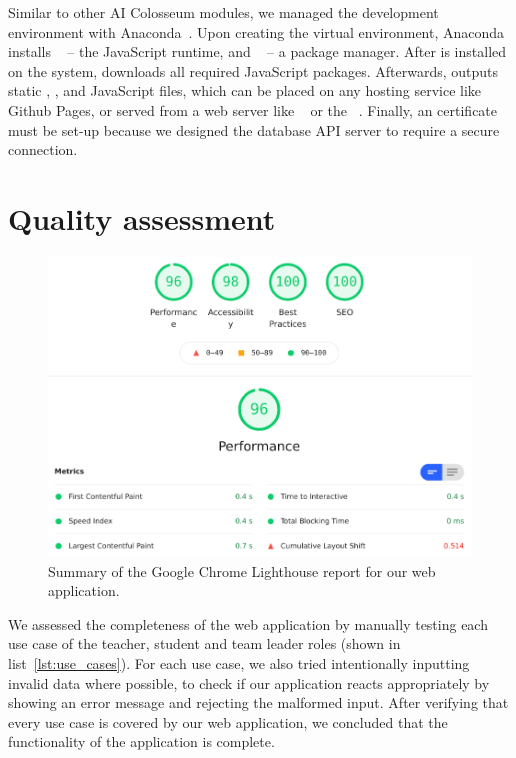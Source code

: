 Similar to other AI Colosseum modules, we managed the development environment with Anaconda~\cite{anaconda}. Upon creating the virtual environment, Anaconda installs ~\cite{nodejs} -- the JavaScript runtime, and ~\cite{yarn} -- a  package manager. After  is installed on the system,  downloads all required JavaScript packages. Afterwards,  outputs static , , and JavaScript files, which can be placed on any hosting service like Github Pages, or served from a web server like ~\cite{nginx} or the ~\cite{apache}. Finally, an  certificate must be set-up because we designed the database API server to require a secure  connection. 

\section{Quality assessment}

\begin{figure}[t]
    \centering\includegraphics[scale=0.35]{figures/lighthouse.png}
	\caption{Summary of the Google Chrome Lighthouse report for our web application.}\label{fig:lighthouse}
\end{figure}

We assessed the completeness of the web application by manually testing each use case of the teacher, student and team leader roles (shown in list~\ref{lst:use_cases}). For each use case, we also tried intentionally inputting invalid data where possible, to check if our application reacts appropriately by showing an error message and rejecting the malformed input. After verifying that every use case is covered by our web application, we concluded that the functionality of the application is complete.

